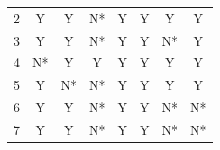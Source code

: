 \documentclass[11pt, oneside]{article}
\begin{document}
\begin{table}[h]
\begin{minipage}{0.44\textwidth}
{\begin{tabular}{@{}cccccccc@{}}
2                 & Y                    & Y                                                                     & N*                                                                   & Y                                                                    & Y                                                                    & Y                                                                  & Y                                                                        \\
3                 & Y                    & Y                                                                     & N*                                                                   & Y                                                                    & Y                                                                    & N*                                                                 & Y                                                                        \\
4                 & N*                    & Y                                                                     & Y                                                                    & Y                                                                    & Y                                                                    & Y                                                                  & Y                                                                        \\
5                 & Y                    & N*                                                                    & N*                                                                    & Y                                                                    & Y                                                                    & Y                                                                  & Y                                                                        \\
6                 & Y                    & Y                                                                     & N*                                                                   & Y                                                                    & Y                                                                    & N*                                                              & N*                                                                      \\
7                 & Y                    & Y                                                                     & N*                                                                   & Y                                                                    & Y                                                                    & N*                                                                 & N*                                                                       \\

\end{tabular}}
\end{minipage}
\end{table}
\end{document}
